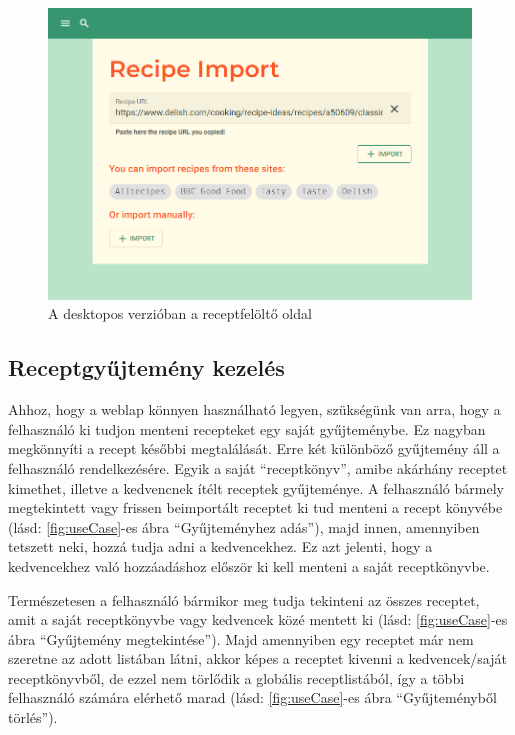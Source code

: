 \documentclass[12pt]{report}
\theoremstyle{definition}
\begin{document}
\begin{figure}[H]%
    \centering
    \includegraphics[width=11.5cm]{pictures/web_import.png}
	\caption{A desktopos verzióban a receptfelöltő oldal} %
    \label{fig:importPage}%
\end{figure}


\subsection{Receptgyűjtemény kezelés}
Ahhoz, hogy a weblap könnyen használható legyen, szükségünk van arra, hogy a felhasználó ki tudjon menteni recepteket egy saját gyűjteménybe. Ez nagyban megkönnyíti a recept későbbi megtalálását. Erre két különböző gyűjtemény áll a felhasználó rendelkezésére. Egyik a saját “receptkönyv”, amibe akárhány receptet kimethet, illetve a kedvencnek ítélt receptek gyűjteménye. A felhasználó bármely megtekintett vagy frissen beimportált receptet ki tud menteni a recept könyvébe (lásd: \ref{fig:useCase}-es ábra “Gyűjteményhez adás”), majd innen, amennyiben tetszett neki, hozzá tudja adni a kedvencekhez. Ez azt jelenti, hogy a kedvencekhez való hozzáadáshoz először ki kell menteni  a saját receptkönyvbe.

Természetesen a felhasználó bármikor meg tudja tekinteni az összes receptet, amit a saját receptkönyvbe vagy kedvencek közé mentett ki (lásd: \ref{fig:useCase}-es ábra “Gyűjtemény megtekintése”). Majd amennyiben egy receptet már nem szeretne az adott listában látni, akkor képes a receptet kivenni a kedvencek/saját receptkönyvből, de ezzel nem törlődik a globális receptlistából, így a többi felhasználó számára elérhető marad (lásd: \ref{fig:useCase}-es ábra “Gyűjteményből törlés”). 
\end{document}
